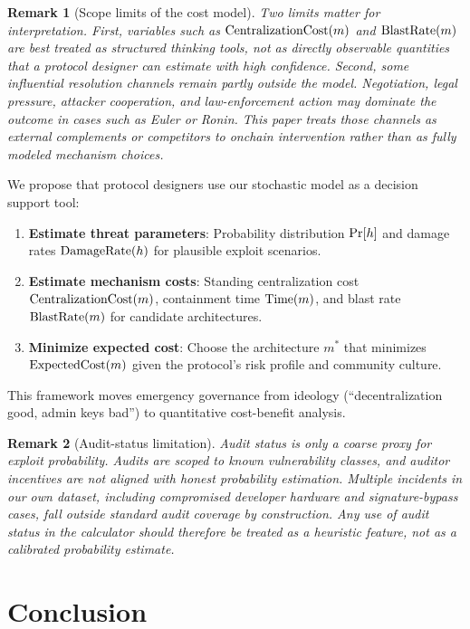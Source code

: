 \documentclass[12pt]{article}
\newtheorem{remark}{Remark}
\begin{document}
\begin{remark}[Scope limits of the cost model]
Two limits matter for interpretation. First, variables such as $\mathrm{CentralizationCost}(m)$ and $\mathrm{BlastRate}(m)$ are best treated as structured thinking tools, not as directly observable quantities that a protocol designer can estimate with high confidence. Second, some influential resolution channels remain partly outside the model. Negotiation, legal pressure, attacker cooperation, and law-enforcement action may dominate the outcome in cases such as Euler or Ronin. This paper treats those channels as external complements or competitors to onchain intervention rather than as fully modeled mechanism choices.
\end{remark}


We propose that protocol designers use our stochastic model as a decision support tool:

\begin{enumerate}
    \item \textbf{Estimate threat parameters}: Probability distribution $\Pr[h]$ and damage rates $\mathrm{DamageRate}(h)$ for plausible exploit scenarios.
    \item \textbf{Estimate mechanism costs}: Standing centralization cost $\mathrm{CentralizationCost}(m)$, containment time $\mathrm{Time}(m)$, and blast rate $\mathrm{BlastRate}(m)$ for candidate architectures.
    \item \textbf{Minimize expected cost}: Choose the architecture $m^*$ that minimizes $\mathrm{ExpectedCost}(m)$ given the protocol's risk profile and community culture.
\end{enumerate}

This framework moves emergency governance from ideology (``decentralization good, admin keys bad'') to quantitative cost-benefit analysis.

\begin{remark}[Audit-status limitation]
Audit status is only a coarse proxy for exploit probability. Audits are scoped to known vulnerability classes, and auditor incentives are not aligned with honest probability estimation. Multiple incidents in our own dataset, including compromised developer hardware and signature-bypass cases, fall outside standard audit coverage by construction. Any use of audit status in the calculator should therefore be treated as a heuristic feature, not as a calibrated probability estimate.
\end{remark}



\section{Conclusion}
\label{sec:conclusion}
\end{document}
